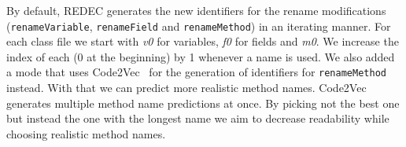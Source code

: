 \documentclass[%
class=scrreprt,
chapterprefix=false,%
open=right,%
twoside=false,%
paper=a4,%
logofile={Logo\_zentral\_farbig\_EN.png},%
thesistype=master,%
UKenglish,%
]{se2thesis}
\theoremstyle{definition}
\newcommand{\rdh}{REDEC\xspace}
\begin{document}
	By default, \rdh generates the new identifiers for the rename modifications (\texttt{renameVariable}, \texttt{renameField} and \texttt{renameMethod}) in an iterating manner. For each class file we start with \textit{v0} for variables, \textit{f0} for fields and \textit{m0}. We increase the index of each (0 at the beginning) by 1 whenever a name is used.
	We also added a mode that uses Code2Vec~\cite{alon2019code2vec} for the generation of identifiers for \texttt{renameMethod} instead. With that we can predict more realistic method names. Code2Vec generates multiple method name predictions at once. By picking not the best one but instead the one with the longest name we aim to decrease readability while choosing realistic method names.
		
	
\end{document}
